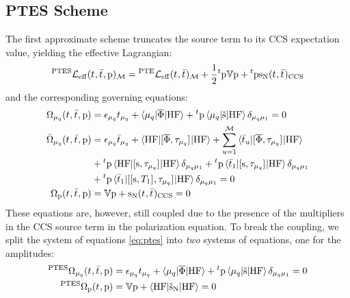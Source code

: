 \subsection*{PTES Scheme}

The first approximate scheme truncates the source term to its
\acrshort{CCS} expectation value, yielding the effective
Lagrangian:\autocite{Caricato2011-tx, Krause2016-ee}
\begin{equation}\label{eq:ptes-cc}
  {}^{\mathrm{PTES}}\mathcal{L}_\mathrm{eff}(t_{}, \bar{t}_{}, \mathrm{p})_\mathcal{M} =
  {}^\mathrm{PTE}\mathcal{L}_\mathrm{eff}(t_{}, \bar{t}_{})_\mathcal{M}
  + \frac{1}{2}{}^t\mathrm{p}\mathbb{V}\mathrm{p} + {}^t\mathrm{p}\mathrm{s}_{\mathrm{N}}(t_{},
  \bar{t}_{})_\mathrm{CCS}
\end{equation}
and the corresponding governing equations:
\begin{subequations}\label{eq:ptes}
  \begin{align}
   \Omega_{\mu_q}(t_{}, \bar{t}_{}, \mathrm{p})  &=
   \epsilon_{\mu_q}t_{\mu_q} + \braket{\mu_q | \overline{\Phi} | \mathrm{HF}}
   + {}^t\mathrm{p}\braket{\mu_q | \check{\mathrm{s}} | \mathrm{HF}}\delta_{\mu_q\mu_1}
             = 0 \\
   \bar{\Omega}_{\mu_q}(t_{}, \bar{t}_{}, \mathrm{p})
    &=
    \epsilon_{\mu_q}\bar{t}_{\mu_q} +
    \braket{\mathrm{HF} | [ \overline{\Phi}, \tau_{\mu_q} ]^{} | \mathrm{HF}} +
    \sum_{u=1}^{\mathcal{M}}\braket{\bar{t}_{u} |
    [ \overline{\Phi}, \tau_{\mu_q} ]^{} | \mathrm{HF}}
    \nonumber \\
    &+
    {}^t\mathrm{p}\braket{\mathrm{HF} | [ \mathrm{s}, \tau_{\mu_q} ]^{} | \mathrm{HF}}\delta_{\mu_q\mu_1}
    +
    {}^t\mathrm{p}\braket{\bar{t}_{1} |
    [ \mathrm{s}, \tau_{\mu_q} ]^{} | \mathrm{HF}}\delta_{\mu_q\mu_1}
     \nonumber \\
    &+
    {}^t\mathrm{p}\braket{\bar{t}_{1} |
    [ [ \mathrm{s}, T_1 ]^{}, \tau_{\mu_q} ]^{} | \mathrm{HF}}\delta_{\mu_q\mu_1}
             = 0 \\
    \Omega_{\mathrm{p}}(t_{}, \bar{t}_{}, \mathrm{p})
    &=
    \mathbb{V}\mathrm{p} + \mathrm{s}_{\mathrm{N}}(t_{}, \bar{t}_{})_\mathrm{CCS} = 0
    \label{eq:ptes-cc-polarization-amp}
  \end{align}
\end{subequations}
These equations are, however, still coupled due to the presence of the
multipliers in the \acrshort{CCS} source term in the polarization equation.
To break the coupling, we split the system of equations
\eqref{eq:ptes} into \emph{two} systems of equations, one for the
amplitudes:
\begin{subequations}\label{eq:ptes-amp}
  \begin{align}
   {}^{\mathrm{PTES}}\Omega_{\mu_q}(t_{}, \bar{t}_{}, \mathrm{p})  &=
   \epsilon_{\mu_q}t_{\mu_q} + \braket{\mu_q | \overline{\Phi} | \mathrm{HF}}
   + {}^t\mathrm{p}\braket{\mu_q | \check{\mathrm{s}} | \mathrm{HF}}\delta_{\mu_q\mu_1}
             = 0 \label{eq:ptes-cc-amplitudes} \\
    {}^{\mathrm{PTES}}\Omega_{\mathrm{p}}(t_{}, \mathrm{p})
    &=
    \mathbb{V}\mathrm{p} +
    \braket{\mathrm{HF} | \check{\mathrm{s}}_{\mathrm{N}} | \mathrm{HF}} = 0
  \end{align}
\end{subequations}
